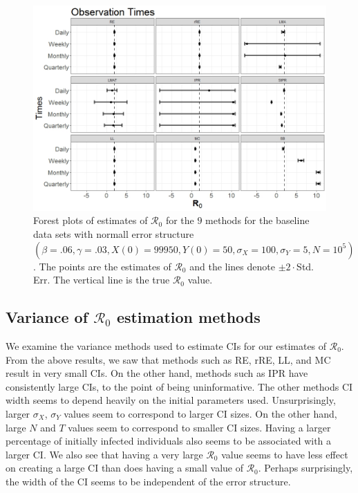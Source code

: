 \documentclass[12pt]{article}
\newcommand{\xxsir}{\ensuremath{9} } %
\newcommand{\rr}{\ensuremath{\mathcal{R}_0}}
\begin{document}
\begin{figure}[H]
	\centering
	\includegraphics[scale=0.5]{images/obs.jpeg}
	\caption{Forest plots of estimates of $\rr$ for the \xxsir methods for the baseline data sets with normall error structure $(\beta=.06, \gamma=.03, X(0) = 99950, Y(0)=50, \sigma_X=100, \sigma_Y=5, N=10^5)$.  The points are the estimates of $\rr$ and the lines denote $\pm 2\cdot $Std. Err.  The vertical line is the true $\rr$ value.}\label{fig:obs}
\end{figure}

  





\subsection{Variance of $\rr$ estimation methods}\label{sec:sim-var-res}
We examine the variance methods used to estimate CIs for our estimates of $\rr$.  From the above results, we saw that methods such as RE, rRE, LL, and MC result in very small CIs.  On the other hand, methods such as IPR have consistently large CIs, to the point of being uninformative.  The other methods CI width seems to depend heavily on the initial parameters used.  Unsurprisingly, larger $\sigma_X$, $\sigma_Y$ values seem to correspond to larger CI sizes.  On the other hand, large $N$ and $T$ values seem to correspond to smaller CI sizes.   Having a larger percentage of initially infected individuals also seems to be associated with a larger CI.  We also see that having a very large $\rr$ value seems to have less effect on creating a large CI than does having a small value of $\rr$.  Perhaps surprisingly, the width of the CI seems to be independent of the error structure.
\end{document}
